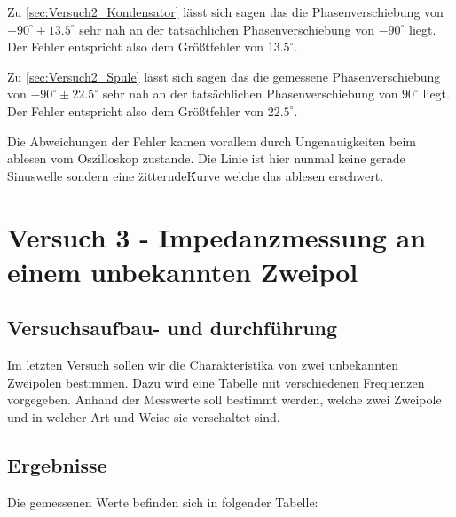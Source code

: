              \noindent Zu \ref{sec:Versuch2_Kondensator} lässt sich sagen das die Phasenverschiebung von $-90^{\circ} \pm 13.5^{\circ}$ sehr nah an der tatsächlichen Phasenverschiebung von $-90^{\circ}$ liegt. Der Fehler entspricht also dem Größtfehler von $13.5^{\circ}$.

             \noindent Zu \ref{sec:Versuch2_Spule} lässt sich sagen das die gemessene Phasenverschiebung von $-90^{\circ} \pm 22.5^{\circ}$ sehr nah an der tatsächlichen Phasenverschiebung von $90^{\circ}$ liegt. Der Fehler entspricht also dem Größtfehler von $22.5^{\circ}$. 

             \noindent Die Abweichungen der Fehler kamen vorallem durch Ungenauigkeiten beim ablesen vom Oszilloskop zustande. Die Linie ist hier nunmal keine gerade Sinuswelle sondern eine \"zitternde\" Kurve welche das ablesen erschwert. 

\section{Versuch 3 - Impedanzmessung an einem unbekannten Zweipol}
    
    \subsection{Versuchsaufbau- und durchführung}

        Im letzten Versuch sollen wir die Charakteristika von zwei unbekannten Zweipolen bestimmen. Dazu wird eine Tabelle mit verschiedenen Frequenzen vorgegeben. Anhand der Messwerte soll bestimmt werden, welche zwei Zweipole und in welcher Art und Weise sie verschaltet sind.

    \subsection{Ergebnisse}
    
        Die gemessenen Werte befinden sich in folgender Tabelle:

